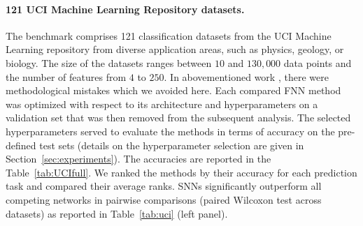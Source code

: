 \documentclass{article}
\begin{document}
\paragraph{121 UCI Machine Learning Repository datasets.} 
The benchmark comprises 121 classification datasets from the UCI Machine Learning repository \cite{bib:Fernandez2014} 
from diverse application areas, such as physics, geology, or biology.
The size of the datasets ranges between $10$ and $130,000$ data points and the 
number of features from $4$ to $250$. 
In abovementioned work \citep{bib:Fernandez2014},
there were methodological mistakes \citep{bib:Wainberg2016} which we avoided here. 
Each compared FNN method
was optimized with respect to its architecture and hyperparameters on a validation set that was then 
removed from the subsequent analysis. 
The selected hyperparameters served to evaluate the methods in terms of accuracy on 
the pre-defined test sets (details on the hyperparameter selection are given in Section~\ref{sec:experiments}).
The accuracies are reported in the Table~\ref{tab:UCIfull}. 
We ranked the methods by their accuracy for each
prediction task and compared their average ranks.
SNNs significantly outperform all competing networks in pairwise comparisons (paired
Wilcoxon test across datasets) as reported in Table~\ref{tab:uci} (left panel).
\end{document}
